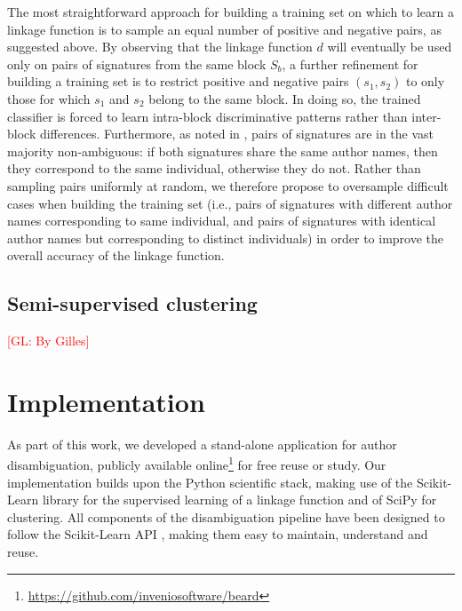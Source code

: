 \documentclass{article}
\newcommand{\glnote}[1]{\textcolor{red}{[GL: #1]}}
\begin{document}
The most straightforward approach for building a training set on which to learn
a linkage function is to sample an equal number of positive and negative pairs,
as suggested above. By observing that the linkage function $d$ will eventually
be used only on pairs of signatures from the same block $S_b$, a further
refinement for building a training set is to restrict  positive and negative
pairs $(s_1, s_2)$ to only those for which $s_1$ and $s_2$ belong to the same
block. In doing so, the trained classifier is forced to learn intra-block
discriminative patterns rather than inter-block differences. Furthermore, as
noted in \citep{lange2011frequency}, pairs of signatures are in the vast
majority non-ambiguous: if both signatures share the same author names, then
they correspond to the same individual, otherwise they do not. Rather than
sampling pairs uniformly at random, we therefore propose to  oversample
difficult cases when building the training set (i.e., pairs of signatures with
different author names corresponding to same individual, and pairs of
signatures with identical author names but corresponding to distinct
individuals) in order to improve the overall accuracy of the linkage function.



\subsection{Semi-supervised clustering}
\label{methods:clustering}
\glnote{By Gilles}






\section{Implementation}
\label{implementation}

As part of this work, we developed a stand-alone application for author
disambiguation, publicly available
online\footnote{\url{https://github.com/inveniosoftware/beard}} for free reuse
or study.  Our implementation builds upon the Python scientific stack, making
use of the Scikit-Learn library \citep{scikitlearn} for the supervised learning
of a linkage function and of SciPy \citep{scipy} for clustering. All
components of the disambiguation pipeline have been designed to follow the
Scikit-Learn API \citep{scikitlearnAPI}, making them easy to maintain,
understand and reuse.
\end{document}
